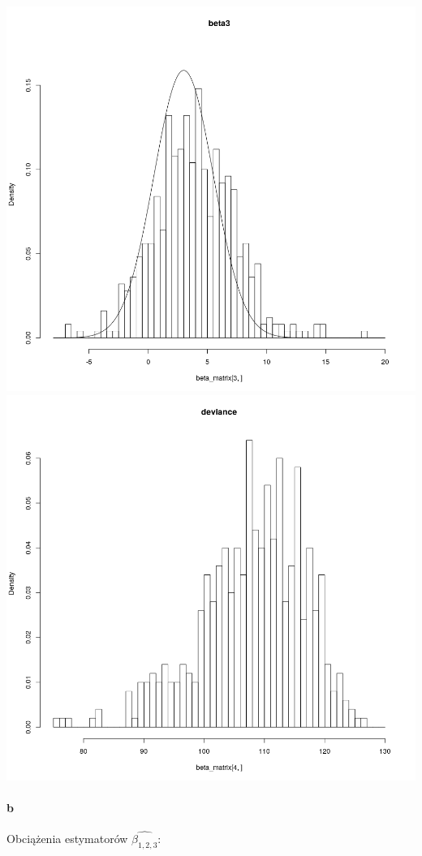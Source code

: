\documentclass[a4paper,11pt]{article}
\begin{document}
\includegraphics[scale=.35]{533.png} 
\includegraphics[scale=.35]{534.png} 


\paragraph{b} Obciążenia estymatorów $\widehat{\beta_{1, 2, 3}}$:
\end{document}
